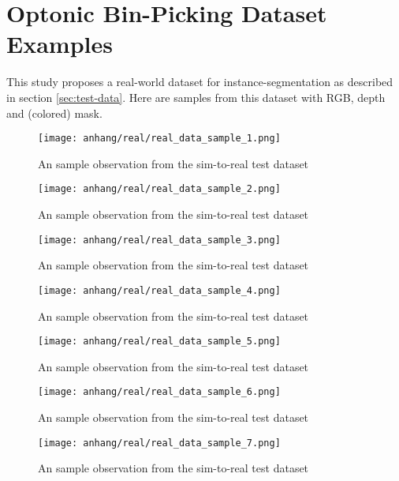 \chapter{Optonic Bin-Picking Dataset Examples}
\label{appendix:testdata-examples-simtoreal}

	This study proposes a real-world dataset for instance-segmentation as described in section \ref{sec:test-data}. Here are samples from this dataset with RGB, depth and (colored) mask.
	
	\begin{figure}[H]
		\centering
		\texttt{[image: anhang/real/real\_data\_sample\_1.png]}
		\caption[An sample observation from the sim-to-real test dataset.]{An sample observation from the sim-to-real test dataset}
	\end{figure}
	\begin{figure}[H]
		\centering
		\texttt{[image: anhang/real/real\_data\_sample\_2.png]}
		\caption[An sample observation from the sim-to-real test dataset.]{An sample observation from the sim-to-real test dataset}
	\end{figure}
	\begin{figure}[H]
		\centering
		\texttt{[image: anhang/real/real\_data\_sample\_3.png]}
		\caption[An sample observation from the sim-to-real test dataset.]{An sample observation from the sim-to-real test dataset}
	\end{figure}
	\begin{figure}[H]
		\centering
		\texttt{[image: anhang/real/real\_data\_sample\_4.png]}
		\caption[An sample observation from the sim-to-real test dataset.]{An sample observation from the sim-to-real test dataset}
	\end{figure}
	\begin{figure}[H]
		\centering
		\texttt{[image: anhang/real/real\_data\_sample\_5.png]}
		\caption[An sample observation from the sim-to-real test dataset.]{An sample observation from the sim-to-real test dataset}
	\end{figure}
	\begin{figure}[H]
		\centering
		\texttt{[image: anhang/real/real\_data\_sample\_6.png]}
		\caption[An sample observation from the sim-to-real test dataset.]{An sample observation from the sim-to-real test dataset}
	\end{figure}
	\begin{figure}[H]
		\centering
		\texttt{[image: anhang/real/real\_data\_sample\_7.png]}
		\caption[An sample observation from the sim-to-real test dataset.]{An sample observation from the sim-to-real test dataset}
	\end{figure}
